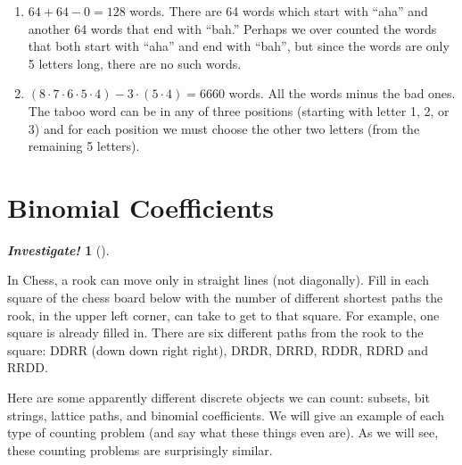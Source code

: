 \documentclass[10pt,]{book}
\theoremstyle{plain}
\theoremstyle{definition}
\theoremstyle{definition}
\newtheorem{investigation}[project]{\emph{Investigate!}}
\theoremstyle{definition}
\numberwithin{equation}{section}
\begin{document}
\begin{exerciselist}
\begin{enumerate}[label=(\alph*)]
\item\hypertarget{li-409}{}\(64 + 64 - 0 = 128\) words. There are 64 words which start with ``aha'' and another 64 words that end with ``bah.'' Perhaps we over counted the words that both start with ``aha'' and end with ``bah'', but since the words are only 5 letters long, there are no such words.%
\item\hypertarget{li-410}{}\((8\cdot 7\cdot 6\cdot 5\cdot 4) - 3\cdot (5\cdot 4) = 6660\) words. All the words minus the bad ones. The taboo word can be in any of three positions (starting with letter 1, 2, or 3) and for each position we must choose the other two letters (from the remaining 5 letters).%
\end{enumerate}
\end{exerciselist}
\typeout{************************************************}
\typeout{************************************************}
\section[Binomial Coefficients]{Binomial Coefficients}\label{sec_counting-binom}
\begin{investigation}[]\label{investigation-7}

      In Chess, a rook can move only in straight lines (not diagonally). Fill in each square of the chess board below with the number of different shortest paths the rook, in the upper left corner, can take to get to that square. For example, one square is already filled in. There are six different paths from the rook to the square: DDRR (down down right right), DRDR, DRRD, RDDR, RDRD and RRDD.
\leavevmode%
\begin{figure}
\centering
{
}
\end{figure}
\end{investigation}

    Here are some apparently different discrete objects we can count: subsets, bit strings, lattice paths, and binomial coefficients. We will give an example of each type of counting problem (and say what these things even are). As we will see, these counting problems are surprisingly similar.
\typeout{************************************************}
\typeout{************************************************}
\end{document}
